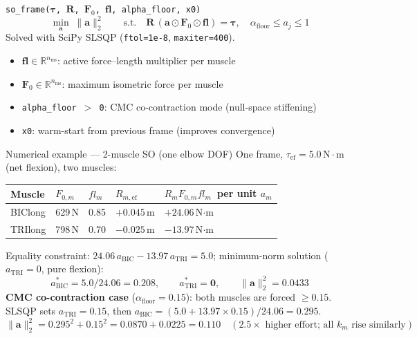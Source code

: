 \documentclass[11pt,a4paper]{article}
\newcommand{\R}{\mathbb{R}}
\newcommand{\bR}{\bm{R}}
\newcommand{\ba}{\bm{a}}
\newcommand{\bF}{\bm{F}}
\newcommand{\btau}{\bm{\tau}}
\begin{document}
\begin{eqbox}{\texttt{so\_frame($\btau$, $\bR$, $\bF_0$, $\bm{fl}$, alpha\_floor, x0)}}
\begin{equation}
\min_{\ba} \;\|\ba\|_2^2 \qquad
\text{s.t.}\quad \bR\,(\ba \odot \bF_0 \odot \bm{fl}) = \btau,
\quad \alpha_\text{floor} \leq a_j \leq 1
\end{equation}
Solved with SciPy SLSQP (\texttt{ftol=1e-8}, \texttt{maxiter=400}).
\begin{itemize}\itemsep0pt
  \item $\bm{fl} \in \R^{n_\text{ms}}$: active force--length multiplier per muscle
  \item $\bF_0 \in \R^{n_\text{ms}}$: maximum isometric force per muscle
  \item \texttt{alpha\_floor $>$ 0}: CMC co-contraction mode (null-space stiffening)
  \item \texttt{x0}: warm-start from previous frame (improves convergence)
\end{itemize}
\end{eqbox}

\begin{notebox}[PipeBlue]{Numerical example --- 2-muscle SO (one elbow DOF)}
One frame, $\tau_\text{ef}=5.0\,\text{N}{\cdot}\text{m}$ (net flexion), two muscles:
\begin{center}\small
\begin{tabular}{lllll}
\toprule
Muscle & $F_{0,m}$ & $fl_m$ & $R_{m,\text{ef}}$ & $R_{m}F_{0,m}fl_m$~per unit $a_m$ \\
\midrule
BIClong & 629\,N & 0.85 & $+0.045$\,m & $+24.06$\,N$\cdot$m \\
TRIlong & 798\,N & 0.70 & $-0.025$\,m & $-13.97$\,N$\cdot$m \\
\bottomrule
\end{tabular}
\end{center}
Equality constraint:
$24.06\,a_\text{BIC} - 13.97\,a_\text{TRI} = 5.0$; \quad
minimum-norm solution ($a_\text{TRI}=0$, pure flexion):
\[
a_\text{BIC}^* = 5.0/24.06 = \mathbf{0.208}, \qquad a_\text{TRI}^*=\mathbf{0},
\qquad \|\ba\|_2^2 = 0.0433
\]
\textbf{CMC co-contraction case} ($\alpha_\text{floor}=0.15$):
both muscles are forced $\geq0.15$.
SLSQP sets $a_\text{TRI}=0.15$, then $a_\text{BIC}=(5.0+13.97\times0.15)/24.06=0.295$.
\[
\|\ba\|_2^2 = 0.295^2 + 0.15^2 = 0.0870 + 0.0225 = \mathbf{0.110}
\quad (\text{2.5}\times\text{ higher effort; all }k_m\text{ rise similarly})
\]
\end{notebox}
\end{document}
